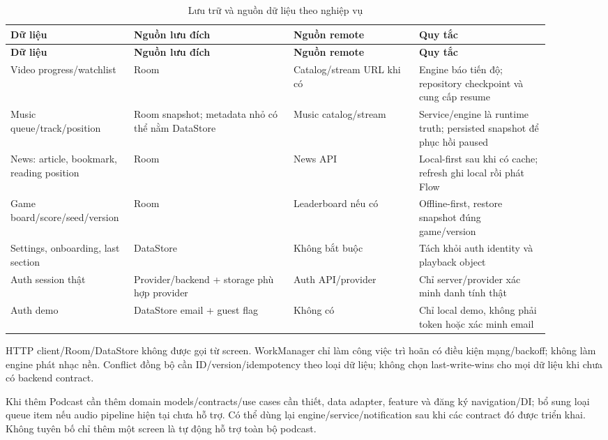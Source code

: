 \begingroup
\small
\renewcommand{\arraystretch}{1.2}
\setlength{\tabcolsep}{3pt}
\begin{longtable}{>{\RaggedRight\arraybackslash}p{0.17\linewidth}>{\RaggedRight\arraybackslash}p{0.28\linewidth}>{\RaggedRight\arraybackslash}p{0.22\linewidth}>{\RaggedRight\arraybackslash}p{0.23\linewidth}}
\caption{Lưu trữ và nguồn dữ liệu theo nghiệp vụ}
\label{tab:data-sync}\\
\toprule
\textbf{Dữ liệu} & \textbf{Nguồn lưu đích} & \textbf{Nguồn remote} & \textbf{Quy tắc} \\
\midrule
\endfirsthead
\toprule
\textbf{Dữ liệu} & \textbf{Nguồn lưu đích} & \textbf{Nguồn remote} & \textbf{Quy tắc} \\
\midrule
\endhead
\bottomrule
\endfoot
Video progress/watchlist & Room & Catalog/stream URL khi có & Engine báo tiến độ; repository checkpoint và cung cấp resume \\
Music queue/track/position & Room snapshot; metadata nhỏ có thể nằm DataStore & Music catalog/stream & Service/engine là runtime truth; persisted snapshot để phục hồi paused \\
News: article, bookmark, reading position & Room & News API & Local-first sau khi có cache; refresh ghi local rồi phát Flow \\
Game board/score/seed/version & Room & Leaderboard nếu có & Offline-first, restore snapshot đúng game/version \\
Settings, onboarding, last section & DataStore & Không bắt buộc & Tách khỏi auth identity và playback object \\
Auth session thật & Provider/backend + storage phù hợp provider & Auth API/provider & Chỉ server/provider xác minh danh tính thật \\
Auth demo & DataStore email + guest flag & Không có & Chỉ local demo, không phải token hoặc xác minh email \\
\end{longtable}
\endgroup

HTTP client/Room/DataStore không được gọi từ screen. WorkManager chỉ làm công việc trì hoãn có điều kiện mạng/backoff; không làm engine phát nhạc nền. Conflict đồng bộ cần ID/version/idempotency theo loại dữ liệu; không chọn last-write-wins cho mọi dữ liệu khi chưa có backend contract.

Khi thêm Podcast cần thêm domain models/contracts/use cases cần thiết, data adapter, feature và đăng ký navigation/DI; bổ sung loại queue item nếu audio pipeline hiện tại chưa hỗ trợ. Có thể dùng lại engine/service/notification sau khi các contract đó được triển khai. Không tuyên bố chỉ thêm một screen là tự động hỗ trợ toàn bộ podcast.
